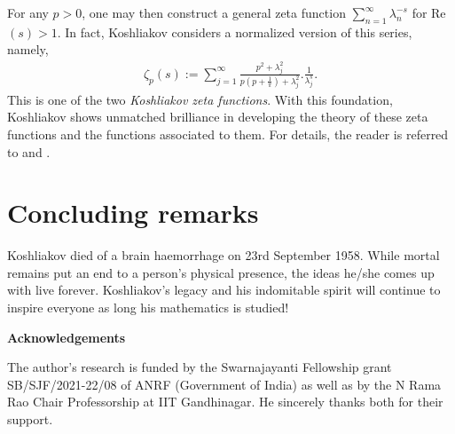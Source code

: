 \documentclass[12pt,reqno]{amsart}
\renewcommand{\(}{\left\(}
\renewcommand{\)}{\right\)}
\renewcommand{\[}{\left\[}
\renewcommand{\]}{\right\]}
\numberwithin{equation}{section}
\theoremstyle{plain}
\begin{document}
 For any $p>0$, one may then construct a general zeta function $\sum_{n=1}^{\infty}\lambda_n^{-s}$ for Re$(s)>1$. In fact, Koshliakov considers a normalized version of this series, namely, 
 	\begin{align*}
 	\zeta_{p}(s):=\sum_{j=1}^{\infty}\frac{p^2+\lambda^2_{j}}{p\left(p+\frac{1}{\pi}\right)+\lambda^2_j}.\frac{1}{\lambda^s_j}.
 \end{align*}
This is one of the two \emph{Koshliakov zeta functions}. With this foundation, Koshliakov shows unmatched brilliance in developing the theory of these zeta functions and the functions associated to them. For details, the reader is referred to \cite{koshliakov3} and \cite{dixitgupta}.

\section{Concluding remarks}
Koshliakov died of a brain haemorrhage on 23rd September 1958. While mortal remains put an end to a person's physical presence, the ideas he/she comes up with live forever. Koshliakov's legacy and his indomitable spirit will continue to inspire everyone as long his mathematics is studied!

\begin{center}
\textbf{Acknowledgements}
\end{center}
The author's research is funded by the Swarnajayanti Fellowship grant SB/SJF/2021-22/08 of ANRF (Government of India) as well as by the N Rama Rao Chair Professorship at IIT Gandhinagar. He sincerely thanks both for their support.
\end{document}
